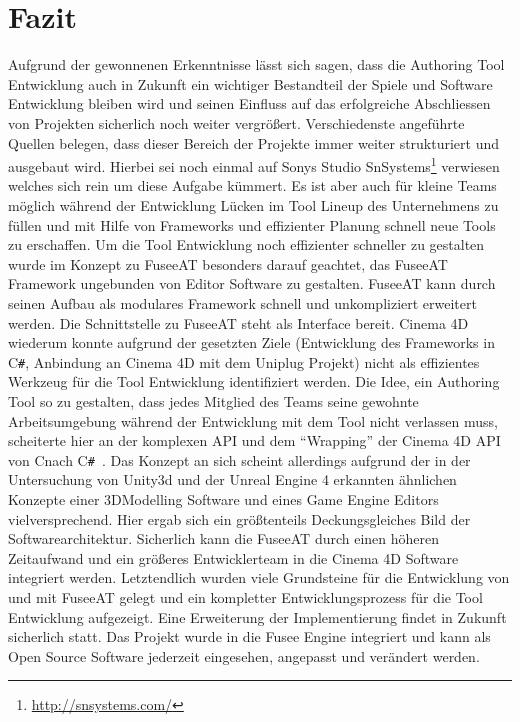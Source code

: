 \documentclass[pagesize, paper=a4, fontsize=12pt, titlepage=true, headings=small, headnosepline, abstractoff, liststotoc, nochapterprefix, plainheadsepline, twoside]{scrreprt}
\newcommand{\CS}{C\texttt{\#}}
\newcommand{\CSS}{C\texttt{\# }}
\newcommand{\CPP}{C\nolinebreak\hspace{-.05em}\raisebox{.4ex}{\tiny\bf +}\nolinebreak\hspace{-.10em}\raisebox{.4ex}{\tiny\bf +}}
\begin{document}

\section{Fazit}
Aufgrund der gewonnenen Erkenntnisse lässt sich sagen, dass die Authoring Tool Entwicklung  auch in Zukunft ein wichtiger Bestandteil der Spiele und Software Entwicklung bleiben wird und seinen Einfluss auf das erfolgreiche Abschliessen von Projekten sicherlich noch weiter vergrößert. Verschiedenste angeführte Quellen belegen, dass dieser Bereich der Projekte immer weiter strukturiert und ausgebaut wird. Hierbei sei noch einmal auf Sonys Studio SnSystems\footnote{\url{http://snsystems.com/}} verwiesen welches sich rein um diese Aufgabe kümmert. Es ist aber auch für kleine Teams möglich während der Entwicklung Lücken im Tool Lineup des Unternehmens zu füllen und mit Hilfe von Frameworks und effizienter Planung schnell neue Tools zu erschaffen.
Um die Tool Entwicklung noch effizienter schneller zu gestalten wurde im Konzept zu FuseeAT besonders darauf geachtet, das FuseeAT Framework ungebunden von Editor Software zu gestalten. FuseeAT kann durch seinen Aufbau als modulares Framework schnell und unkompliziert erweitert werden. Die Schnittstelle zu FuseeAT steht als Interface bereit. Cinema 4D wiederum konnte aufgrund der gesetzten Ziele (Entwicklung des Frameworks in \CS, Anbindung an Cinema 4D mit dem Uniplug Projekt) nicht als effizientes Werkzeug für die Tool Entwicklung identifiziert werden. Die Idee, ein Authoring Tool so zu gestalten, dass jedes Mitglied des Teams seine gewohnte Arbeitsumgebung während der Entwicklung mit dem Tool nicht verlassen muss, scheiterte hier an der komplexen API und dem “Wrapping” der Cinema 4D API von \CPP nach \CSS. Das Konzept an sich scheint allerdings aufgrund der in der Untersuchung von Unity3d und der Unreal Engine 4 erkannten ähnlichen Konzepte einer 3DModelling Software und eines Game Engine Editors vielversprechend. Hier ergab sich ein größtenteils Deckungsgleiches Bild der Softwarearchitektur. Sicherlich kann die FuseeAT durch einen höheren Zeitaufwand und ein größeres Entwicklerteam in die Cinema 4D Software integriert werden.
Letztendlich wurden viele Grundsteine für die Entwicklung von und mit FuseeAT gelegt und ein kompletter Entwicklungsprozess für die Tool Entwicklung aufgezeigt. Eine Erweiterung der Implementierung findet in Zukunft sicherlich statt. Das Projekt wurde in die Fusee Engine integriert und kann als Open Source Software jederzeit eingesehen, angepasst und verändert werden.
\end{document}
